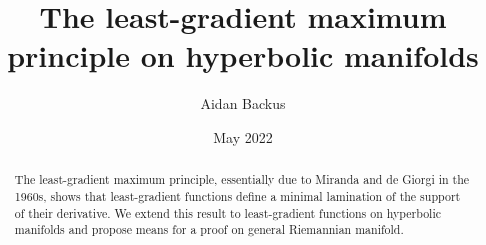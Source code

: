 \documentclass[reqno,12pt,letterpaper]{amsart}
\title[Hyperbolic least-gradient maximum principle]{The least-gradient maximum principle on hyperbolic manifolds}
\author{Aidan Backus}
\date{May 2022}
\newcommand{\CC}{\mathbf{C}}
\newcommand{\vol}{*1}
\newcommand{\dfn}[1]{\emph{#1}\index{#1}}
\newtheorem{theorem}{Theorem}[section]
\theoremstyle{definition}
\numberwithin{equation}{section}
\begin{document}
\begin{abstract}
The least-gradient maximum principle, essentially due to Miranda and de Giorgi in the 1960s, shows that least-gradient functions define a minimal lamination of the support of their derivative.
We extend this result to least-gradient functions on hyperbolic manifolds and propose means for a proof on general Riemannian manifold.
\end{abstract}

\maketitle



\let\clearpage\relax










\end{document}
